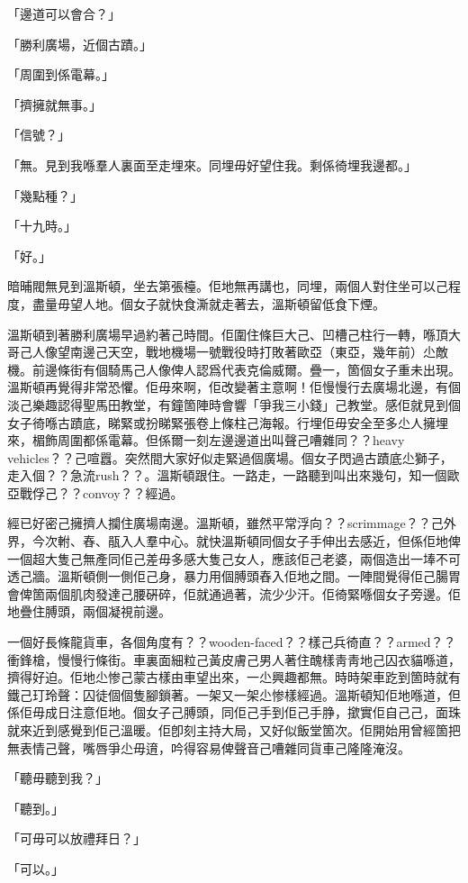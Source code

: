 「邊道可以會合？」

「勝利廣場，近個古蹟。」

「周圍到係電幕。」

「擠擁就無事。」

「信號？」

「無。見到我喺羣人裏面至走埋來。同埋毋好望住我。剩係徛埋我邊都。」

「幾點種？」

「十九時。」

「好。」

暗晡閥無見到溫斯頓，坐去第張檯。佢地無再講也，同埋，兩個人對住坐可以己程度，盡量毋望人地。個女子就快食澌就走著去，溫斯頓留低食下煙。

溫斯頓到著勝利廣場早過約著己時間。佢圍住條巨大己、凹槽己柱行一轉，喺頂大哥己人像望南邊己天空，戰地機場一號戰役時打敗著歐亞（東亞，幾年前）尐敵機。前邊條街有個騎馬己人像俾人認爲代表克倫威爾。疊一，箇個女子重未出現。溫斯頓再覺得非常恐懼。佢毋來啊，佢改變著主意啊！佢慢慢行去廣場北邊，有個淡己樂趣認得聖馬田教堂，有鐘箇陣時會響「爭我三小錢」己教堂。感佢就見到個女子徛喺古蹟底，睇緊或扮睇緊張卷上條柱己海報。行埋佢毋安全至多尐人擁埋來，楣飾周圍都係電幕。但係爾一刻左邊邊道出叫聲己嘈雜同？？heavy vehicles？？己喧囂。突然間大家好似走緊過個廣場。個女子閃過古蹟底尐獅子，走入個？？急流rush？？。溫斯頓跟住。一路走，一路聽到叫出來幾句，知一個歐亞戰俘己？？convoy？？經過。

經已好密己擁擠人攔住廣場南邊。溫斯頓，雖然平常浮向？？scrimmage？？己外界，今次軵、舂、瓹入人羣中心。就快溫斯頓同個女子手伸出去感近，但係佢地俾一個超大隻己無產同佢己差毋多感大隻己女人，應該佢己老婆，兩個造出一埲不可透己牆。溫斯頓側一側佢己身，暴力用個膊頭舂入佢地之間。一陣間覺得佢己腸胃會俾箇兩個肌肉發達己腰硏碎，佢就通過著，流少少汗。佢徛緊喺個女子旁邊。佢地疊住膊頭，兩個凝視前邊。

一個好長條龍貨車，各個角度有？？wooden-faced？？樣己兵徛直？？armed？？衝鋒槍，慢慢行條街。車裏面細粒己黃皮膚己男人著住醜樣靑靑地己囚衣貓喺道，擠得好迫。佢地尐惨己蒙古樣由車望出來，一尐興趣都無。時時架車趷到箇時就有鐵己玎玲聲：囚徒個個隻腳鎖著。一架又一架尐惨樣經過。溫斯頓知佢地喺道，但係佢毋成日注意佢地。個女子己膊頭，同佢己手到佢己手㬹，撳實佢自己己，面珠就來近到感覺到佢己溫暖。佢卽刻主持大局，又好似飯堂箇次。佢開始用曾經箇把無表情己聲，嘴唇爭尐毋逳，吟得容易俾聲音己嘈雜同貨車己隆隆淹沒。

「聽毋聽到我？」

「聽到。」

「可毋可以放禮拜日？」

「可以。」

